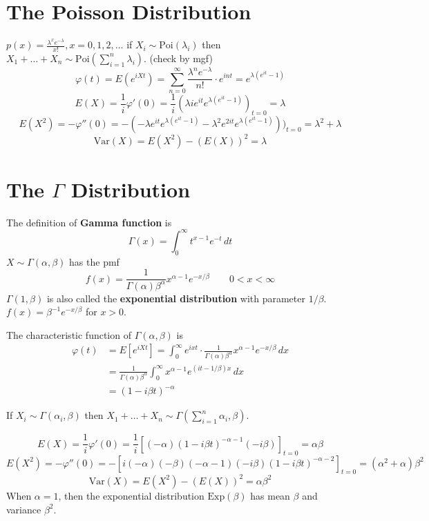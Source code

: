 \section{The Poisson Distribution}

$p(x)=\frac{\lambda^{x}e^{ -\lambda }}{x!},x=0,1,2,\dots$ if $X_i\sim \text{Poi}(\lambda _i)$ then $X_1+\dots +X_n\sim \text{Poi}(\sum_{i=1}^{n}\lambda _i)$. (check by mgf)
\[
\varphi(t)=E(e^{ iXt })=\sum_{n=0}^{\infty} \frac{\lambda^{n}e^{ -\lambda }}{n!}\cdot e^{ int }=e^{ \lambda(e^{ it }-1) }
\]
\[
E(X)=\frac{1}{i}\varphi'(0)=\frac{1}{i}(\lambda ie^{ it }e^{ \lambda(e^{ it }-1) })_{t=0}=\lambda
\]
\[
E(X^2)=-\varphi''(0)=-(-\lambda e^{ it }e^{ \lambda(e^{ it }-1) }-\lambda^{2}e^{ 2it }e^{ \lambda(e^{ it }-1) }))_{t=0}=\lambda^{2}+\lambda
\]
\[
\mathrm{Var}(X)=E(X^2)-(E(X))^2=\lambda
\]
\section{The \texorpdfstring{$\Gamma$}{Gamma} Distribution}

The definition of \textbf{Gamma function} is
\[
\Gamma(x)=\int_{0}^{\infty} t^{x-1}e^{ -t } \, dt 
\]
$X\sim\Gamma(\alpha,\beta)$  has the pmf
\[
f(x)=\frac{1}{\Gamma(\alpha)\beta^{\alpha}}x^{\alpha-1}e^{ -x/\beta }\qquad 0<x<\infty
\]
$\Gamma(1,\beta)$ is also called the \textbf{exponential distribution} with parameter $1/\beta$. $f(x)=\beta ^{-1}e^{ -x/\beta }$ for $x>0$.

The characteristic function of $\Gamma(\alpha,\beta)$ is
\[
\begin{aligned}
\varphi(t) & =E[e^{ iXt }]=\int_{0}^{\infty} e^{ ixt }\cdot\frac{1}{\Gamma(\alpha)\beta^{\alpha}}x^{\alpha-1}e^{ -x/\beta }  \, dx \\
 & =\frac{1}{\Gamma(\alpha)\beta^{\alpha}}\int_{0}^{\infty} x^{\alpha-1}e^{ (it-1/\beta)x } \, dx  \\
 & = (1-i\beta t)^{-\alpha}
\end{aligned} 
\]
\begin{note}
If $X_i\sim\Gamma(\alpha _i,\beta)$ then $X_1+\dots+X_n\sim\Gamma\left( \sum_{i=1}^{n}\alpha _i ,\beta\right)$.
\end{note}
\[
E(X)=\frac{1}{i}\varphi'(0)=\frac{1}{i}[(-\alpha)(1-i\beta t)^{-\alpha-1}(-i\beta)]_{t=0}=\alpha\beta
\]
\[
E(X^2)=-\varphi''(0)=-[i(-\alpha)(-\beta)(-\alpha-1)(-i\beta)(1-i\beta t)^{-\alpha-2}]_{t=0}=(\alpha^{2}+\alpha)\beta^{2}
\]
\[
\mathrm{Var}(X)=E(X^2)-(E(X))^2=\alpha\beta^{2}
\]
When $\alpha=1$, then the exponential distribution $\text{Exp}(\beta)$ has mean $\beta$ and variance $\beta^{2}$.

